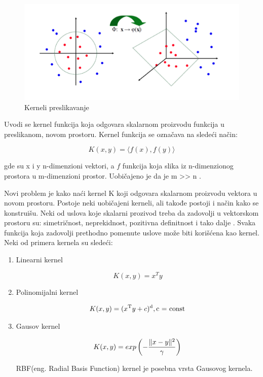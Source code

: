 \documentclass[12pt,oneside]{memoir}
\begin{document}
\begin{figure}[h!]
\centering
\includegraphics[width=.7\textwidth]{images/kernels.png}
\caption{ Kerneli preslikavanje }
\label{img:kernels}
\end{figure}

\noindent
Uvodi se kernel funkcija koja odgovara skalarnom proizvodu funkcija u preslikanom, novom prostoru.  Kernel funkcija se označava na sledeći način:

\begin{equation}
	K(x, y) = \langle f(x),f(y) \rangle
\end{equation}

\noindent
gde su x i y n-dimenzioni vektori, a $f$ funkcija koja slika iz n-dimenzionog prostora u m-dimenzioni prostor. Uobičajeno je da je m >> n  \cite{kernel}.

Novi problem je kako naći kernel K koji odgovara skalarnom proizvodu vektora u novom prostoru. Postoje neki uobičajeni kerneli, ali takođe postoji i način kako se konstruišu. Neki od uslova koje skalarni prozivod treba da zadovolji u vektorskom prostoru su: simetričnost, neprekidnost, pozitivna definitnost i tako dalje \cite{JelenaPHD}. Svaka funkcija koja zadovolji prethodno pomenute uslove može biti korišćena kao kernel.
\noindent
Neki od primera kernela su sledeći:

\begin{enumerate}
\item Linearni kernel

\begin{equation}
	K(x, y) = x^Ty
\end{equation}

\item Polinomijalni kernel

\begin{equation}
	K(x, y) = (x\textsuperscript{T}y + c)\textsuperscript{d}, \text{c = const}
\end{equation}
\newpage
\item Gausov kernel

\begin{equation}
	K(x, y) = exp\left( - \frac{\|x-y\|\textsuperscript{2}}{\gamma} \right)
\end{equation}

\noindent
RBF(eng. Radial Basis Function) kernel je posebna vrsta Gausovog kernela.
\end{enumerate}
\end{document}
